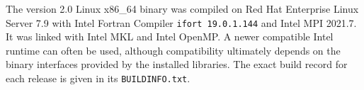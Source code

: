 The version 2.0 Linux x86\_64 binary was compiled on Red Hat Enterprise Linux Server 7.9 with Intel Fortran Compiler \texttt{ifort 19.0.1.144} and Intel MPI 2021.7. It was linked with Intel MKL and Intel OpenMP. A newer compatible Intel runtime can often be used, although compatibility ultimately depends on the binary interfaces provided by the installed libraries. The exact build record for each release is given in its \texttt{BUILDINFO.txt}.

